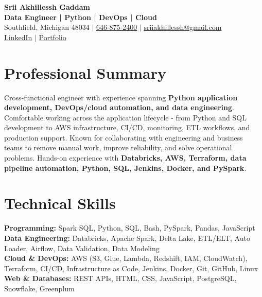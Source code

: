 \documentclass[letterpaper,10pt]{article}
\begin{document}
\fontsize{9.35pt}{10.45pt}\selectfont

\begin{center}
    {\LARGE \textbf{Srii Akhillessh Gaddam}} \\[-1pt]
    \textbf{Data Engineer | Python | DevOps | Cloud} \\[2pt]
    Southfield, Michigan 48034 $|$
    \href{tel:6468752400}{646-875-2400} $|$
    \href{mailto:sriiakhillessh@gmail.com}{sriiakhillessh@gmail.com} \\[1pt]
    \href{https://www.linkedin.com/in/srii-akhiilessh-gaddam-b48668191/}{LinkedIn} $|$
    \href{https://sriiakhillesshg.github.io/portfolio/}{Portfolio}
\end{center}
\vspace{-8pt}

\section{Professional Summary}
\small{Cross-functional engineer with experience spanning \textbf{Python application development, DevOps/cloud automation, and data engineering}. Comfortable working across the application lifecycle - from Python and SQL development to AWS infrastructure, CI/CD, monitoring, ETL workflows, and production support. Known for collaborating with engineering and business teams to remove manual work, improve reliability, and solve operational problems. Hands-on experience with \textbf{Databricks, AWS, Terraform, data pipeline automation, Python, SQL, Jenkins, Docker, and PySpark}.}

\section{Technical Skills}
\small{
\textbf{Programming:} Spark SQL, Python, SQL, Bash, PySpark, Pandas, JavaScript \\
\textbf{Data Engineering:} Databricks, Apache Spark, Delta Lake, ETL/ELT, Auto Loader, Airflow, Data Validation, Data Modeling \\
\textbf{Cloud \& DevOps:} AWS (S3, Glue, Lambda, Redshift, IAM, CloudWatch), Terraform, CI/CD, Infrastructure as Code, Jenkins, Docker, Git, GitHub, Linux \\
\textbf{Web \& Databases:} REST APIs, HTML, CSS, JavaScript, PostgreSQL, Snowflake, Greenplum
}
\end{document}
